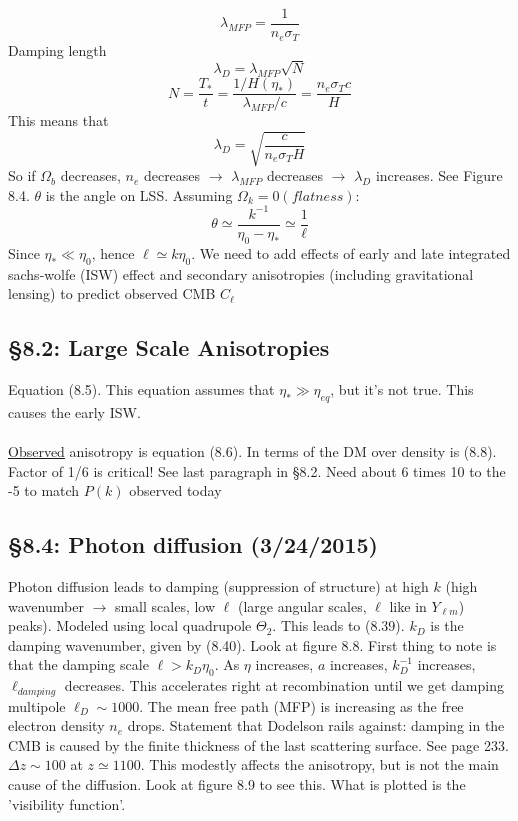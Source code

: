 \documentclass[12pt]{article}
\begin{document}
$$\lambda_{MFP}=\frac{1}{n_e\sigma_T}$$
Damping length
$$\lambda_D=\lambda_{MFP}\sqrt{N}$$
$$N=\frac{T_*}{t}=\frac{1/H(\eta_*)}{\lambda_{MFP}/c}=\frac{n_e\sigma_Tc}{H}$$
This means that
$$\lambda_D=\sqrt{\frac{c}{n_e\sigma_TH}}$$
So if $\Omega_b$ decreases, $n_e$ decreases $\rightarrow$ $\lambda_{MFP}$ decreases $\rightarrow$ $\lambda_D$ increases.  See Figure 8.4.  $\theta$ is the angle on LSS.  Assuming $\Omega_k=0 (flatness):$
$$\theta\simeq\frac{k^{-1}}{\eta_0-\eta_*}\simeq\frac{1}{\ell}$$
Since $\eta_* \ll \eta_0$, hence $\ell \simeq k\eta_0$.  We need to add effects of early and late integrated sachs-wolfe (ISW) effect and secondary anisotropies (including gravitational lensing) to predict observed CMB $C_\ell$
\subsection*{\S8.2: Large Scale Anisotropies}
Equation (8.5).  This equation assumes that $\eta_* \gg \eta_{eq}$, but it's not true.  This causes the early ISW.
\\ \\
\underline{Observed} anisotropy is equation (8.6).  In terms of the DM over density is (8.8).  Factor of 1/6 is critical!  See last paragraph in \S8.2.  Need about 6 times 10 to the -5 to match $P(k)$ observed today
\subsection*{\S8.4: Photon diffusion (3/24/2015)}
Photon diffusion leads to damping (suppression of structure) at high $k$ (high wavenumber $\rightarrow$ small scales, low $\ell$ (large angular scales, $\ell$ like in $Y_{\ell m}$) peaks).  Modeled using local quadrupole $\Theta_2$.  This leads to (8.39).  $k_D$ is the damping wavenumber, given by (8.40).  Look at figure 8.8.  First thing to note is that the damping scale $\ell>k_D\eta_0$.  As $\eta$ increases, $a$ increases, $k_D^{-1}$ increases, $\ell_{damping}$ decreases.  This accelerates right at recombination until we get damping multipole $\ell_D\sim1000$.  The mean free path (MFP) is increasing as the free electron density $n_e$ drops.  Statement that Dodelson rails against: damping in the CMB is caused by the finite thickness of the last scattering surface.  See page 233.  $\Delta z \sim 100$ at $z\simeq1100$.  This modestly affects the anisotropy, but is not the main cause of the diffusion.  Look at figure 8.9 to see this.  What is plotted is the 'visibility function'.
\end{document}
